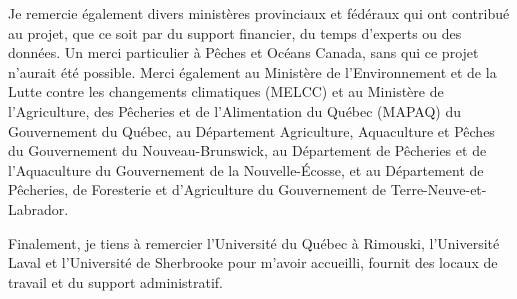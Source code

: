 Je remercie également divers ministères provinciaux et fédéraux qui ont
contribué au projet, que ce soit par du support financier, du temps
d'experts ou des données. Un merci particulier à Pêches et Océans
Canada, sans qui ce projet n'aurait été possible. Merci également au
Ministère de l'Environnement et de la Lutte contre les changements
climatiques (MELCC) et au Ministère de l'Agriculture, des Pêcheries et
de l'Alimentation du Québec (MAPAQ) du Gouvernement du Québec, au
Département Agriculture, Aquaculture et Pêches du Gouvernement du
Nouveau-Brunswick, au Département de Pêcheries et de l'Aquaculture du
Gouvernement de la Nouvelle-Écosse, et au Département de Pêcheries, de
Foresterie et d'Agriculture du Gouvernement de Terre-Neuve-et-Labrador.

Finalement, je tiens à remercier l'Université du Québec à Rimouski,
l'Université Laval et l'Université de Sherbrooke pour m'avoir accueilli,
fournit des locaux de travail et du support administratif.
